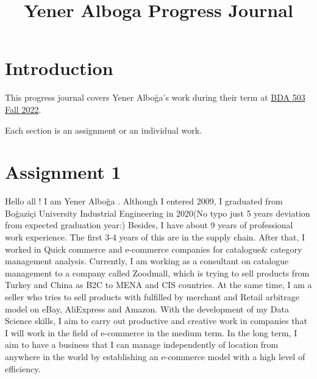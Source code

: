 \documentclass[
  letterpaper,
  DIV=11,
  numbers=noendperiod]{scrreprt}
\title{Yener Alboga Progress Journal}
\author{}
\date{}
\renewcommand*\contentsname{Table of contents}
\newcommand\contentsname{Table of contents}
\begin{document}
\maketitle
\ifdefined\Shaded\renewenvironment{Shaded}{\begin{tcolorbox}[interior hidden, boxrule=0pt, enhanced, borderline west={3pt}{0pt}{shadecolor}, breakable, sharp corners, frame hidden]}{\end{tcolorbox}}\fi

\renewcommand*\contentsname{Table of contents}
{
\hypersetup{linkcolor=}
\setcounter{tocdepth}{2}
\tableofcontents
}

\hypertarget{introduction}{%
\chapter*{Introduction}\label{introduction}}

This progress journal covers Yener Alboğa's work during their term at
\href{https://mef-bda503.github.io/fall22/}{BDA 503 Fall 2022}.

Each section is an assignment or an individual work.


\hypertarget{assignment-1}{%
\chapter{Assignment 1}\label{assignment-1}}

Hello all ! I am Yener Alboğa . Although I entered 2009, I graduated
from Boğaziçi University Industrial Engineering in 2020(No typo just 5
years deviation from expected graduation year:) Besides, I have about 9
years of professional work experience. The first 3-4 years of this are
in the supply chain. After that, I worked in Quick commerce and
e-commerce companies for catalogue\& category management analysis.
Currently, I am working as a consultant on catalogue management to a
company called Zoodmall, which is trying to sell products from Turkey
and China as B2C to MENA and CIS countries. At the same time, I am a
seller who tries to sell products with fulfilled by merchant and Retail
arbitrage model on eBay, AliExpress and Amazon. With the development of
my Data Science skills, I aim to carry out productive and creative work
in companies that I will work in the field of e-commerce in the medium
term. In the long term, I aim to have a business that I can manage
independently of location from anywhere in the world by establishing an
e-commerce model with a high level of efficiency.
\end{document}

